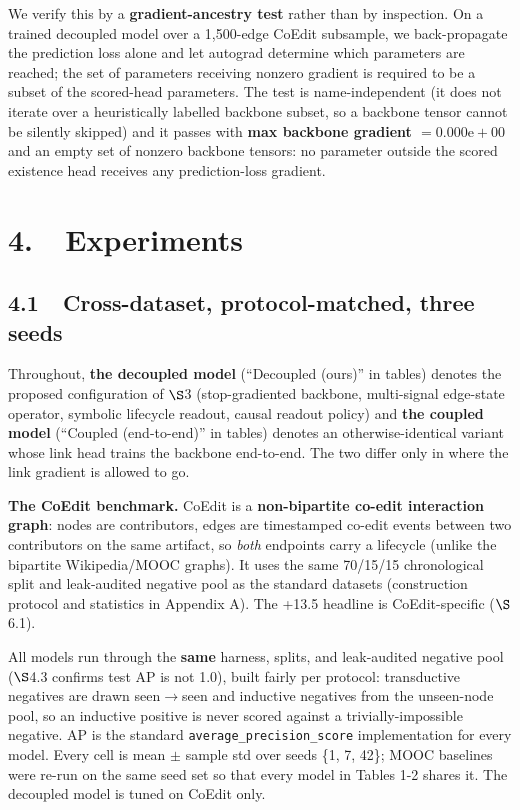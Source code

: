 \documentclass[conference]{IEEEtran}
\begin{document}
We verify this by a \textbf{gradient-ancestry test} rather than by inspection. On a trained decoupled model over a 1,500-edge CoEdit subsample, we back-propagate the prediction loss alone and let autograd determine which parameters are reached; the set of parameters receiving nonzero gradient is required to be a subset of the scored-head parameters. The test is name-independent (it does not iterate over a heuristically labelled backbone subset, so a backbone tensor cannot be silently skipped) and it passes with \textbf{max \textbar backbone gradient\textbar{} \(= 0.000\mathrm{e}{+}00\)} and an empty set of nonzero backbone tensors: no parameter outside the scored existence head receives any prediction-loss gradient.

\section*{4.~~Experiments}

\subsection*{4.1~~Cross-dataset, protocol-matched, three seeds}

Throughout, \textbf{the decoupled model} (``Decoupled (ours)'' in tables) denotes the proposed configuration of $\S$3 (stop-gradiented backbone, multi-signal edge-state operator, symbolic lifecycle readout, causal readout policy) and \textbf{the coupled model} (``Coupled (end-to-end)'' in tables) denotes an otherwise-identical variant whose link head trains the backbone end-to-end. The two differ only in where the link gradient is allowed to go.

\textbf{The CoEdit benchmark.} CoEdit is a \textbf{non-bipartite co-edit interaction graph}: nodes are contributors, edges are timestamped co-edit events between two contributors on the same artifact, so \emph{both} endpoints carry a lifecycle (unlike the bipartite Wikipedia/MOOC graphs). It uses the same 70/15/15 chronological split and leak-audited negative pool as the standard datasets (construction protocol and statistics in Appendix A). The +13.5 headline is CoEdit-specific ($\S$6.1).

All models run through the \textbf{same} harness, splits, and leak-audited negative pool ($\S$4.3 confirms test AP is not 1.0), built fairly per protocol: transductive negatives are drawn seen$\rightarrow$seen and inductive negatives from the unseen-node pool, so an inductive positive is never scored against a trivially-impossible negative. AP is the standard \texttt{average\_precision\_score} implementation for every model. Every cell is mean $\pm$ sample std over seeds \{1, 7, 42\}; MOOC baselines were re-run on the same seed set so that every model in Tables 1-2 shares it. The decoupled model is tuned on CoEdit only.
\end{document}
